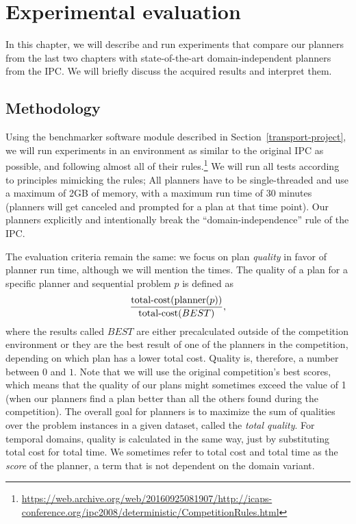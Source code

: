 \chapter{Experimental evaluation}

In this chapter, we will describe and run experiments
that compare our planners from the last two chapters
with state-of-the-art domain-independent planners from the IPC.
We will briefly discuss the acquired results and interpret them.

\section{Methodology}

Using the benchmarker software module described in Section~\ref{transport-project}, we will run experiments in an
environment as similar to the original
IPC as possible, and following almost all of their rules.\footnote{\url{https://web.archive.org/web/20160925081907/http://icaps-conference.org/ipc2008/deterministic/CompetitionRules.html}}
We will run all tests according to principles mimicking the rules;
All planners have to be single-threaded and use a maximum of 2GB of memory, with a maximum run time of 30 minutes (planners will
get canceled and prompted for a plan at that time point).
Our planners explicitly and intentionally break the ``domain-independence'' rule of the IPC.

The evaluation criteria remain the same:
we focus on plan \textit{quality} in favor of planner run time,
although we will mention the times.
The quality of a plan for a specific planner and sequential problem $p$ is defined as
$$\frac{\textrm{total-cost}(\textrm{planner}(p))}{\textrm{total-cost}(BEST)},$$
where the results called $BEST$
are either precalculated outside of the competition environment or they are the best result of one of the planners in the competition, depending on which plan has a lower total cost.
Quality is, therefore, a number between $0$ and $1$.
Note that we will use the original competition's best scores,
which means that the quality of our plans
might sometimes exceed the value of 1
(when our planners find a plan better than all the others found during the competition).
The overall goal for planners is to maximize the sum of qualities over the problem instances in a given dataset, called the \textit{total quality}.
For temporal domains, quality is calculated in the same way, just by substituting total cost
for total time. We sometimes refer to total cost and total time as the \textit{score} of the planner, a term that is not dependent on the domain variant.

